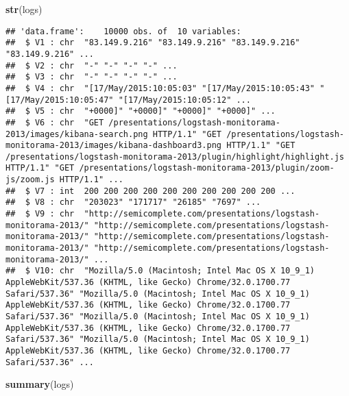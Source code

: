 \documentclass[]{article}
\newenvironment{Shaded}{\begin{snugshade}}{\end{snugshade}}
\newcommand{\KeywordTok}[1]{\textcolor[rgb]{0.13,0.29,0.53}{\textbf{#1}}}
\newcommand{\NormalTok}[1]{#1}
\begin{document}
\begin{Shaded}
\begin{Highlighting}[]
\KeywordTok{str}\NormalTok{(logs)}
\end{Highlighting}
\end{Shaded}

\begin{verbatim}
## 'data.frame':    10000 obs. of  10 variables:
##  $ V1 : chr  "83.149.9.216" "83.149.9.216" "83.149.9.216" "83.149.9.216" ...
##  $ V2 : chr  "-" "-" "-" "-" ...
##  $ V3 : chr  "-" "-" "-" "-" ...
##  $ V4 : chr  "[17/May/2015:10:05:03" "[17/May/2015:10:05:43" "[17/May/2015:10:05:47" "[17/May/2015:10:05:12" ...
##  $ V5 : chr  "+0000]" "+0000]" "+0000]" "+0000]" ...
##  $ V6 : chr  "GET /presentations/logstash-monitorama-2013/images/kibana-search.png HTTP/1.1" "GET /presentations/logstash-monitorama-2013/images/kibana-dashboard3.png HTTP/1.1" "GET /presentations/logstash-monitorama-2013/plugin/highlight/highlight.js HTTP/1.1" "GET /presentations/logstash-monitorama-2013/plugin/zoom-js/zoom.js HTTP/1.1" ...
##  $ V7 : int  200 200 200 200 200 200 200 200 200 200 ...
##  $ V8 : chr  "203023" "171717" "26185" "7697" ...
##  $ V9 : chr  "http://semicomplete.com/presentations/logstash-monitorama-2013/" "http://semicomplete.com/presentations/logstash-monitorama-2013/" "http://semicomplete.com/presentations/logstash-monitorama-2013/" "http://semicomplete.com/presentations/logstash-monitorama-2013/" ...
##  $ V10: chr  "Mozilla/5.0 (Macintosh; Intel Mac OS X 10_9_1) AppleWebKit/537.36 (KHTML, like Gecko) Chrome/32.0.1700.77 Safari/537.36" "Mozilla/5.0 (Macintosh; Intel Mac OS X 10_9_1) AppleWebKit/537.36 (KHTML, like Gecko) Chrome/32.0.1700.77 Safari/537.36" "Mozilla/5.0 (Macintosh; Intel Mac OS X 10_9_1) AppleWebKit/537.36 (KHTML, like Gecko) Chrome/32.0.1700.77 Safari/537.36" "Mozilla/5.0 (Macintosh; Intel Mac OS X 10_9_1) AppleWebKit/537.36 (KHTML, like Gecko) Chrome/32.0.1700.77 Safari/537.36" ...
\end{verbatim}

\begin{Shaded}
\begin{Highlighting}[]
\KeywordTok{summary}\NormalTok{(logs)}
\end{Highlighting}
\end{Shaded}
\end{document}
